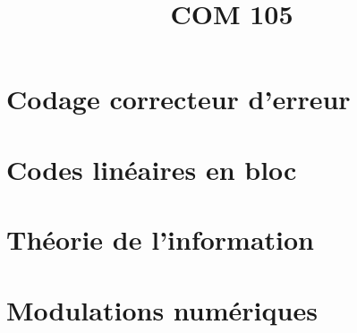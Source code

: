 \documentclass[a4paper,11pt]{article}
\title{\vspace{-1.2cm} \textbf{COM 105}}
\begin{document}
\maketitle

\vspace{-1.5cm}

\section{Codage correcteur d'erreur}

	

\section{Codes linéaires en bloc}

	

\section{Théorie de l'information}

	

\section{Modulations numériques}

	
\end{document}
